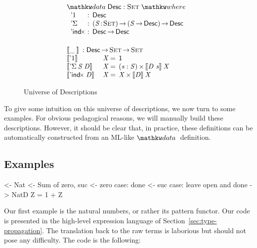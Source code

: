 \begin{figure}

\[\stk{
\begin{array}{ll}
\stk{
\data \Desc : \Set \where \\
\;\;\begin{array}{@{}l@{\::\:\:}l@{\quad}l}
    \DUnit          & \Desc \\
    \DSigma{\!}{\!} & \PI{\V{S}}{\Set} \PIS{\V{S} \To \Desc} \Desc \\
    \DIndx{\!}      & \Desc \To \Desc
\end{array}
}
\vspace{0.2in}
\\
\stk{
\descop{\_\:}{} : \Desc \To \Set \To \Set \\
\begin{array}{@{}ll@{\:=\:\:}ll}
\descop{\DUnit}{& \V{X}}        &  \Unit                                       \\
\descop{\DSigma{\V{S}}{\V{D}}}{& \V{X}} &  \SIGMAS{\V{s} : \V{S}}{\descop{\V{D}~\V{s}}{\V{X}}}         \\
\descop{\DIndx{\V{D}}}{& \V{X}}     &  \TIMES{\V{X}}{\descop{\V{D}}{\V{X}}}
\end{array}
}
\end{array}
}\]


\caption{Universe of Descriptions}
\label{fig:desc_universe}

\end{figure}

To give some intuition on this universe of descriptions, we now turn
to some examples. For obvious pedagogical reasons, we will manually
build these descriptions. However, it should be clear that, in
practice, these definitions can be automatically constructed from an
ML-like $\data$ definition.

\subsection{Examples}
\label{sec:desc-examples}

\begin{wstructure}
<- Nat
    <- Sum of zero, suc
    <- zero case: done
    <- suc case: leave open and done
    -> NatD Z = 1 + Z
\end{wstructure}

Our first example is the natural numbers, or rather its pattern
functor. Our code is presented in the high-level expression language
of Section~\ref{sec:type-propagation}. The translation back to the raw
terms is laborious but should not pose any difficulty. The code is the
following:

